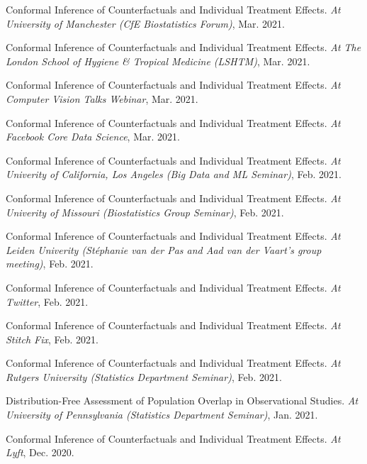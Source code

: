 \documentclass{article}
\begin{document}
\vspace{2mm}
Conformal Inference of Counterfactuals and Individual Treatment Effects. \emph{At University of Manchester (CfE Biostatistics Forum)}, Mar. 2021.

\vspace{2mm}
Conformal Inference of Counterfactuals and Individual Treatment Effects. \emph{At The London School of Hygiene \& Tropical Medicine (LSHTM)}, Mar. 2021.

\vspace{2mm}
Conformal Inference of Counterfactuals and Individual Treatment Effects. \emph{At Computer Vision Talks Webinar}, Mar. 2021.

\vspace{2mm}
Conformal Inference of Counterfactuals and Individual Treatment Effects. \emph{At Facebook Core Data Science}, Mar. 2021.

\vspace{2mm}
Conformal Inference of Counterfactuals and Individual Treatment Effects. \emph{At Univerity of California, Los Angeles (Big Data and ML Seminar)}, Feb. 2021.

\vspace{2mm}
Conformal Inference of Counterfactuals and Individual Treatment Effects. \emph{At Univerity of Missouri (Biostatistics Group Seminar)}, Feb. 2021.

\vspace{2mm}
Conformal Inference of Counterfactuals and Individual Treatment Effects. \emph{At Leiden Univerity (Stéphanie van der Pas and Aad van der Vaart's group meeting)}, Feb. 2021.

\vspace{2mm}
Conformal Inference of Counterfactuals and Individual Treatment Effects. \emph{At Twitter}, Feb. 2021.

\vspace{2mm}
Conformal Inference of Counterfactuals and Individual Treatment Effects. \emph{At Stitch Fix}, Feb. 2021.

\vspace{2mm}
Conformal Inference of Counterfactuals and Individual Treatment Effects. \emph{At Rutgers University (Statistics Department Seminar)}, Feb. 2021.

\vspace{2mm}
Distribution-Free Assessment of Population Overlap in Observational Studies. \emph{At University of Pennsylvania (Statistics Department Seminar)}, Jan. 2021.

\vspace{2mm}
Conformal Inference of Counterfactuals and Individual Treatment Effects. \emph{At Lyft}, Dec. 2020.
\end{document}
